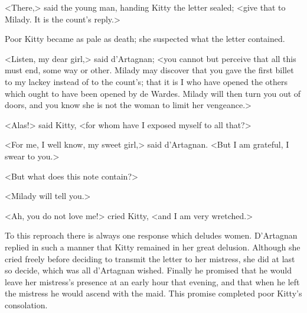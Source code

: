 <There,> said the young man, handing Kitty the letter sealed; <give that to Milady. It is the count's reply.> 

Poor Kitty became as pale as death; she suspected what the letter contained. 

<Listen, my dear girl,> said d'Artagnan; <you cannot but perceive that all this must end, some way or other. Milady may discover that you gave the first billet to my lackey instead of to the count's; that it is I who have opened the others which ought to have been opened by de Wardes. Milady will then turn you out of doors, and you know she is not the woman to limit her vengeance.> 

<Alas!> said Kitty, <for whom have I exposed myself to all that?> 

<For me, I well know, my sweet girl,> said d'Artagnan. <But I am grateful, I swear to you.> 

<But what does this note contain?> 

<Milady will tell you.> 

<Ah, you do not love me!> cried Kitty, <and I am very wretched.> 

To this reproach there is always one response which deludes women. D'Artagnan replied in such a manner that Kitty remained in her great delusion. Although she cried freely before deciding to transmit the letter to her mistress, she did at last so decide, which was all d'Artagnan wished. Finally he promised that he would leave her mistress's presence at an early hour that evening, and that when he left the mistress he would ascend with the maid. This promise completed poor Kitty's consolation. 